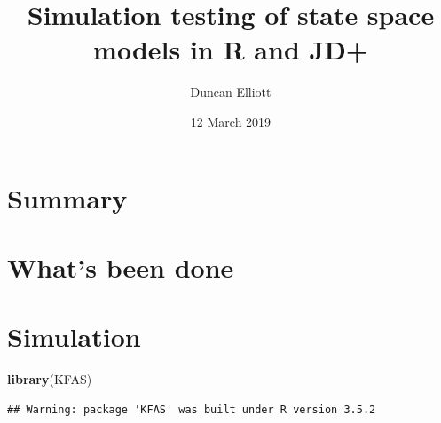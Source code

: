 \documentclass[]{article}
\title{Simulation testing of state space models in R and JD+}
\author{Duncan Elliott}
\date{12 March 2019}
\newenvironment{Shaded}{\begin{snugshade}}{\end{snugshade}}
\newcommand{\KeywordTok}[1]{\textcolor[rgb]{0.13,0.29,0.53}{\textbf{#1}}}
\newcommand{\NormalTok}[1]{#1}
\begin{document}
\maketitle

\section{Summary}\label{summary}

\section{What's been done}\label{whats-been-done}

\section{Simulation}\label{simulation}

\begin{Shaded}
\begin{Highlighting}[]
\KeywordTok{library}\NormalTok{(KFAS)}
\end{Highlighting}
\end{Shaded}

\begin{verbatim}
## Warning: package 'KFAS' was built under R version 3.5.2
\end{verbatim}
\end{document}
